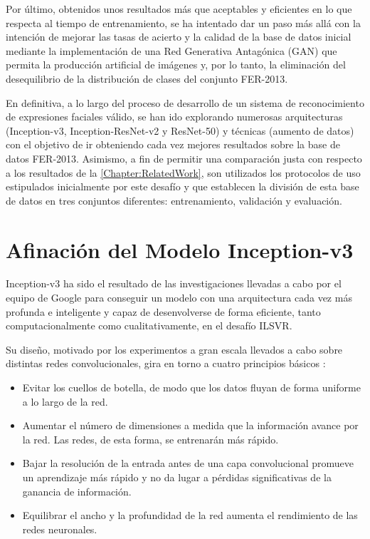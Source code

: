 Por último, obtenidos unos resultados más que aceptables y eficientes en lo que respecta al tiempo de entrenamiento, se ha intentado dar un paso más allá con la intención de mejorar las tasas de acierto y la calidad de la base de datos inicial mediante la implementación de una Red Generativa Antagónica (GAN) que permita la producción artificial de imágenes y, por lo tanto, la eliminación del desequilibrio de la distribución de clases del conjunto FER-2013.

En definitiva, a lo largo del proceso de desarrollo de un sistema de reconocimiento de expresiones faciales válido, se han ido explorando numerosas arquitecturas (Inception-v3, Inception-ResNet-v2 y ResNet-50) y técnicas (aumento de datos) con el objetivo de ir obteniendo cada vez mejores resultados sobre la base de datos FER-2013. Asimismo, a fin de permitir una comparación justa con respecto a los resultados de la \autoref{Chapter:RelatedWork}, son utilizados los protocolos de uso estipulados inicialmente por este desafío y que establecen la división de esta base de datos en tres conjuntos diferentes: entrenamiento, validación y evaluación.

\section{Afinación del Modelo Inception-v3}

Inception-v3 ha sido el resultado de las investigaciones llevadas a cabo por el equipo de Google para conseguir un modelo con una arquitectura cada vez más profunda e inteligente y capaz de desenvolverse de forma eficiente, tanto computacionalmente como cualitativamente, en el desafío ILSVR.

Su diseño, motivado por los experimentos a gran escala llevados a cabo sobre distintas redes convolucionales, gira en torno a cuatro principios básicos \cite{Inception-v3}:
\begin{itemize}
  \item Evitar los cuellos de botella, de modo que los datos fluyan de forma uniforme a lo largo de la red.
  \item Aumentar el número de dimensiones a medida que la información avance por la red. Las redes, de esta forma, se entrenarán más rápido.
  \item Bajar la resolución de la entrada antes de una capa convolucional promueve un aprendizaje más rápido y no da lugar a pérdidas significativas de la ganancia de información.
  \item Equilibrar el ancho y la profundidad de la red aumenta el rendimiento de las redes neuronales.
\end{itemize}

